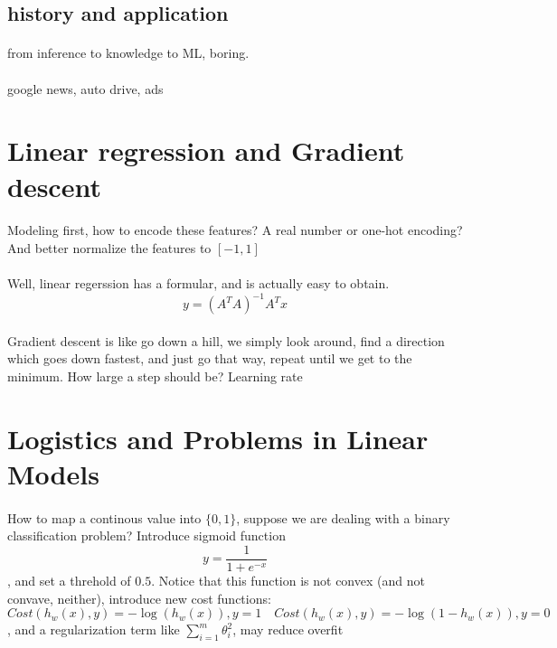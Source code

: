 \documentclass{article}
\begin{document}
  \subsection{history and application}
    \paragraph{} from inference to knowledge to ML, boring.
    \paragraph{} google news, auto drive, ads

\section{Linear regression and Gradient descent}
  \paragraph{} Modeling first, how to encode these features? A real number or one-hot encoding? And better normalize the features to $[-1, 1]$
  \paragraph{} Well, linear regerssion has a formular, and is actually easy to obtain.
  \begin{equation}
    y = (A^{T}A)^{-1}A^{T}x
  \end{equation}
  \paragraph{} Gradient descent is like go down a hill, we simply look around, find a direction which goes down fastest, and just go that way, repeat until we get to the minimum. How large a step should be? Learning rate

\section{Logistics and Problems in Linear Models}
  \paragraph{} How to map a continous value into $\{0, 1\}$, suppose we are dealing with a binary classification problem? Introduce sigmoid function
  \begin{equation}
    y = \frac{1}{1 + e^{-x}}
  \end{equation}
  , and set a threhold of $0.5$. Notice that this function is not convex (and not convave, neither), introduce new cost functions:
  \begin{equation}
    Cost(h_{w}(x), y) = -\log (h_{w}(x)), y = 1 \quad
    Cost(h_{w}(x), y) = -\log (1 - h_{w}(x)), y = 0
  \end{equation}
  , and a regularization term like $\sum_{i=1}^{m}\theta_{i}^{2}$, may reduce overfit
\end{document}
